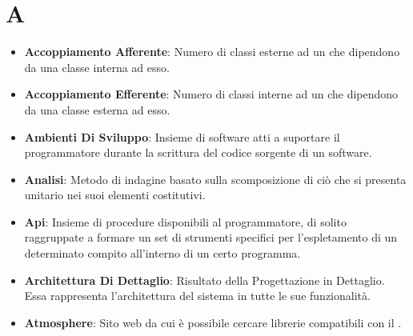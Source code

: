 \section*{A}
\begin{itemize}
	\item
	\textbf{Accoppiamento Afferente}: Numero di classi esterne ad un  che dipendono da una classe interna ad esso.
	\item
	\textbf{Accoppiamento Efferente}: Numero di classi interne ad un  che dipendono da una classe esterna ad esso.
	\item
	\textbf{Ambienti Di Sviluppo}: Insieme di software atti a suportare il programmatore durante la scrittura del codice sorgente di un software.
	\item
	\textbf{Analisi}: Metodo di indagine basato sulla scomposizione di ciò che si presenta unitario nei suoi elementi costitutivi.
	\item
	\textbf{Api}: Insieme di procedure disponibili al programmatore, di solito raggruppate a formare un set di strumenti specifici per l'espletamento di un determinato compito all'interno di un certo programma.
	\item
	\textbf{Architettura Di Dettaglio}: Risultato della Progettazione in Dettaglio. Essa rappresenta l'architettura del sistema in tutte le sue funzionalità.
	\item
	\textbf{Atmosphere}: Sito web da cui è possibile cercare librerie compatibili con il  .
\end{itemize}
\newpage